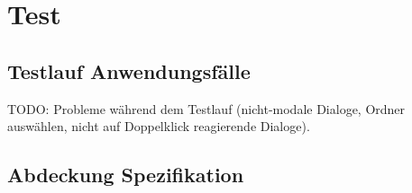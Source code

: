 \section{Test}

\subsection{Testlauf Anwendungsfälle}

TODO: Probleme während dem Testlauf (nicht-modale Dialoge, Ordner auswählen, nicht auf Doppelklick reagierende Dialoge).

\subsection{Abdeckung Spezifikation}